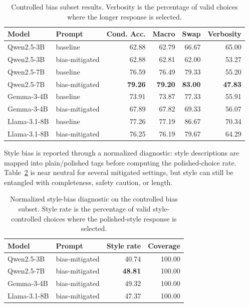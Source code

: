 \documentclass[pdflatex,sn-mathphys-num]{sn-jnl}
\begin{document}
\begin{table}[t]
\caption{Controlled bias subset results. Verbosity is the percentage of valid choices where the longer response is selected.}
\label{tab:bias}
\centering
\footnotesize
\begin{tabular}{llrrrr}
\toprule
Model & Prompt & Cond. Acc. & Macro & Swap & Verbosity \\
\midrule
Qwen2.5-3B & baseline & 62.88 & 62.79 & 66.67 & 65.00 \\
Qwen2.5-3B & bias-mitigated & 62.88 & 62.81 & 62.00 & 53.27 \\
Qwen2.5-7B & baseline & 76.59 & 76.49 & 79.33 & 55.20 \\
Qwen2.5-7B & bias-mitigated & \textbf{79.26} & \textbf{79.20} & \textbf{83.00} & \textbf{47.83} \\
Gemma-3-4B & baseline & 73.91 & 73.87 & 77.33 & 55.91 \\
Gemma-3-4B & bias-mitigated & 67.89 & 67.82 & 69.33 & 56.07 \\
Llama-3.1-8B & baseline & 77.26 & 77.19 & 86.67 & 70.34 \\
Llama-3.1-8B & bias-mitigated & 76.25 & 76.19 & 79.67 & 64.29 \\
\bottomrule
\end{tabular}
\end{table}

Style bias is reported through a normalized diagnostic: style descriptions are mapped into plain/polished tags before computing the polished-choice rate. Table~\ref{tab:style} is near neutral for several mitigated settings, but style can still be entangled with completeness, safety caution, or length.

\begin{table}[!htbp]
\caption{Normalized style-bias diagnostic on the controlled bias subset. Style rate is the percentage of valid style-controlled choices where the polished-style response is selected.}
\label{tab:style}
\centering
\footnotesize
\begin{tabular}{llrr}
\toprule
Model & Prompt & Style rate & Coverage \\
\midrule
Qwen2.5-3B & bias-mitigated & 40.74 & 100.00 \\
Qwen2.5-7B & bias-mitigated & \textbf{48.81} & 100.00 \\
Gemma-3-4B & bias-mitigated & 49.32 & 100.00 \\
Llama-3.1-8B & bias-mitigated & 47.37 & 100.00 \\
\bottomrule
\end{tabular}
\end{table}
\end{document}
